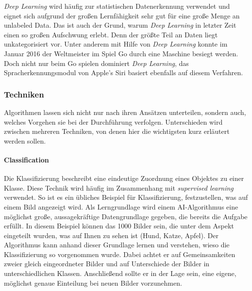 \textit{Deep Learning} wird häufig zur statistischen Datenerkennung verwendet und eignet sich aufgrund der großen Lernfähigkeit sehr gut für eine große Menge an \glqq unlabeled Data\grqq{}. Das ist auch der Grund, warum \textit{Deep Learning} in letzter Zeit einen so großen Aufschwung erlebt. Denn der größte Teil an Daten liegt unkategorisiert vor. Unter anderem mit Hilfe von \textit{Deep Learning} konnte im Januar 2016 der Weltmeister im Spiel Go durch eine Maschine besiegt werden. Doch nicht nur beim Go spielen dominiert \textit{Deep Learning}, das Spracherkennungsmodul von Apple's Siri basiert ebenfalls auf diesem Verfahren. ~\cite{F_DeepLearning_3.3.2.2}

\subsubsection{Techniken}
\label{MLTechniken}

Algorithmen lassen sich nicht nur nach ihren Ansätzen unterteilen, sondern auch, welches Vorgehen sie bei der Durchführung verfolgen. Unterschieden wird zwischen mehreren Techniken, von denen hier die wichtigsten kurz erläutert werden sollen.

\paragraph{Classification}
Die Klassifizierung beschreibt eine eindeutige Zuordnung eines Objektes zu einer Klasse. Diese Technik wird häufig im Zusammenhang mit \textit{supervised learning} verwendet. So ist es ein übliches Beispiel für Klassifizierung, festzustellen, was auf einem Bild angezeigt wird. Als Lerngrundlage wird einem AI-Algorithmus eine möglichst große, aussagekräftige Datengrundlage gegeben, die bereits die Aufgabe erfüllt. In diesem Beispiel können das 1000 Bilder sein, die unter dem Aspekt eingeteilt wurden, was auf Ihnen zu sehen ist (Hund, Katze, Apfel). Der Algorithmus kann anhand dieser Grundlage lernen und verstehen, wieso die Klassifizierung so vorgenommen wurde. Dabei achtet er auf Gemeinsamkeiten zweier gleich eingeordneter Bilder und auf Unterschiede der Bilder in unterschiedlichen Klassen. Anschließend sollte er in der Lage sein, eine eigene, möglichst genaue Einteilung bei neuen Bilder vorzunehmen. \cite{M_DL4J_Many}

